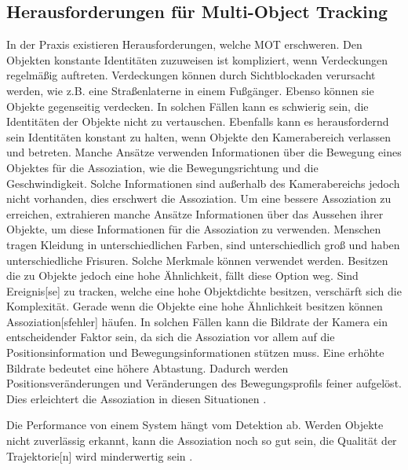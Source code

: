 \subsection{Herausforderungen für Multi-Object Tracking} \label{sec:MOT Herausforderungen}
In der Praxis existieren Herausforderungen, welche \gls{MOT} erschweren. Den Objekten konstante Identitäten zuzuweisen ist kompliziert, wenn Verdeckungen regelmäßig auftreten. Verdeckungen können durch Sichtblockaden verursacht werden, wie z.B. eine Straßenlaterne in einem Fußgänger. Ebenso können sie Objekte gegenseitig verdecken. In solchen Fällen kann es schwierig sein, die Identitäten der Objekte nicht zu vertauschen. Ebenfalls kann es herausfordernd sein Identitäten konstant zu halten, wenn Objekte den Kamerabereich verlassen und betreten. Manche Ansätze verwenden Informationen über die Bewegung eines Objektes für die  \gls{Assoziation}, wie die Bewegungsrichtung und die Geschwindigkeit. Solche Informationen sind außerhalb des Kamerabereichs jedoch nicht vorhanden, dies erschwert die \gls{Assoziation}. Um eine bessere \gls{Assoziation} zu erreichen, extrahieren manche Ansätze Informationen über das Aussehen ihrer Objekte, um diese Informationen für die \gls{Assoziation} zu verwenden. Menschen tragen Kleidung in unterschiedlichen Farben, sind unterschiedlich groß und haben unterschiedliche Frisuren. Solche Merkmale können verwendet werden. Besitzen die zu  Objekte jedoch eine hohe Ähnlichkeit, fällt diese Option weg. Sind \gls{Ereignis}[se] zu tracken, welche eine hohe Objektdichte besitzen, verschärft sich die Komplexität. Gerade wenn die Objekte eine hohe Ähnlichkeit besitzen können \gls{Assoziation}[sfehler] häufen. In solchen Fällen kann die Bildrate der Kamera ein entscheidender Faktor sein, da sich die \gls{Assoziation} vor allem auf die Positionsinformation und Bewegungsinformationen stützen muss. Eine erhöhte Bildrate bedeutet eine höhere Abtastung. Dadurch werden Positionsveränderungen und Veränderungen des Bewegungsprofils feiner aufgelöst. Dies erleichtert die \gls{Assoziation} in diesen Situationen \cite{Luo.2022, Feng.2022}. \par

Die Performance von einem  System hängt vom \gls{Detektion} ab. Werden Objekte nicht zuverlässig erkannt, kann die \gls{Assoziation} noch so gut sein, die Qualität der \gls{Trajektorie}[n] wird minderwertig sein \cite{Luo.2022}. 

